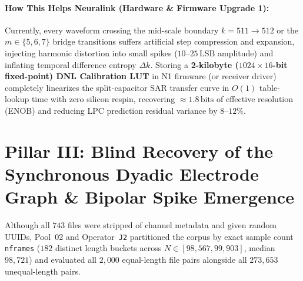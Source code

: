 \documentclass[11pt,letterpaper]{article}
\theoremstyle{definition}
\begin{document}
\paragraph{How This Helps Neuralink (Hardware \& Firmware Upgrade 1):}
Currently, every waveform crossing the mid-scale boundary $k = 511 \to 512$ or the $m \in \{5,6,7\}$ bridge transitions suffers artificial step compression and expansion, injecting harmonic distortion into small spikes ($10\text{--}25\,\text{LSB}$ amplitude) and inflating temporal difference entropy $\Delta k$. Storing a \textbf{2-kilobyte ($1024 \times 16$-bit fixed-point) DNL Calibration LUT} in N1 firmware (or receiver driver) completely linearizes the split-capacitor SAR transfer curve in $O(1)$ table-lookup time with zero silicon respin, recovering $\approx 1.8\,\text{bits}$ of effective resolution (ENOB) and reducing LPC prediction residual variance by $8\text{--}12\%$.

\section[Pillar III: Synchronous Dyadic Graph \& Bipolar Spike Emergence]{Pillar III: Blind Recovery of the Synchronous Dyadic Electrode Graph \& Bipolar Spike Emergence}

Although all $743$ files were stripped of channel metadata and given random UUIDs, Pool~02 and Operator~\texttt{J2} partitioned the corpus by exact sample count \texttt{nframes} ($182$ distinct length buckets across $N \in [98{,}567, 99{,}903]$, median $98{,}721$) and evaluated all $2{,}000$ equal-length file pairs alongside all $273{,}653$ unequal-length pairs.
\end{document}

